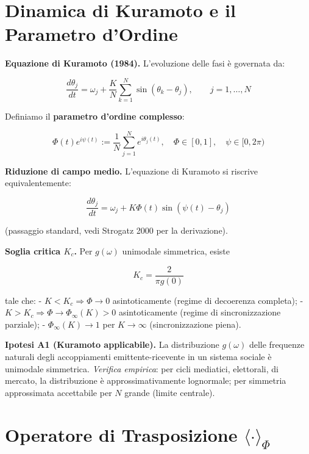 \section{Dinamica di Kuramoto e il Parametro
d'Ordine}\label{dinamica-di-kuramoto-e-il-parametro-dordine}

\Proved{} \textbf{Equazione di Kuramoto (1984).} L'evoluzione delle fasi
è governata da:

\[
\frac{d\theta_j}{dt} = \omega_j + \frac{K}{N} \sum_{k=1}^{N} \sin(\theta_k - \theta_j), \qquad j = 1, \ldots, N
\]

Definiamo il \textbf{parametro d'ordine complesso}:

\[
\Phi(t) e^{i\psi(t)} := \frac{1}{N} \sum_{j=1}^{N} e^{i\theta_j(t)}, \quad \Phi \in [0, 1], \quad \psi \in [0, 2\pi)
\]

\Proved{} \textbf{Riduzione di campo medio.} L'equazione di Kuramoto si
riscrive equivalentemente:

\[
\frac{d\theta_j}{dt} = \omega_j + K \Phi(t) \sin(\psi(t) - \theta_j)
\]

(passaggio standard, vedi Strogatz 2000 per la derivazione).

\Proved{} \textbf{Soglia critica \(K_c\).} Per \(g(\omega)\) unimodale
simmetrica, esiste

\[
K_c = \frac{2}{\pi g(0)}
\]

tale che: - \(K < K_c \Rightarrow \Phi \to 0\) asintoticamente (regime
di decoerenza completa); -
\(K > K_c \Rightarrow \Phi \to \Phi_\infty(K) > 0\) asintoticamente
(regime di sincronizzazione parziale); - \(\Phi_\infty(K) \to 1\) per
\(K \to \infty\) (sincronizzazione piena).

\Hypoth{} \textbf{Ipotesi A1 (Kuramoto applicabile).} La distribuzione
\(g(\omega)\) delle frequenze naturali degli accoppiamenti
emittente-ricevente in un sistema sociale è unimodale simmetrica.
\emph{Verifica empirica}: per cicli mediatici, elettorali, di mercato,
la distribuzione è approssimativamente lognormale; per simmetria
approssimata accettabile per \(N\) grande (limite centrale).



\section{\texorpdfstring{Operatore di Trasposizione
\(\langle \cdot \rangle_\Phi\)}{Operatore di Trasposizione \textbackslash langle \textbackslash cdot \textbackslash rangle\_\textbackslash Phi}}\label{operatore-di-trasposizione-langle-cdot-rangle_phi}

